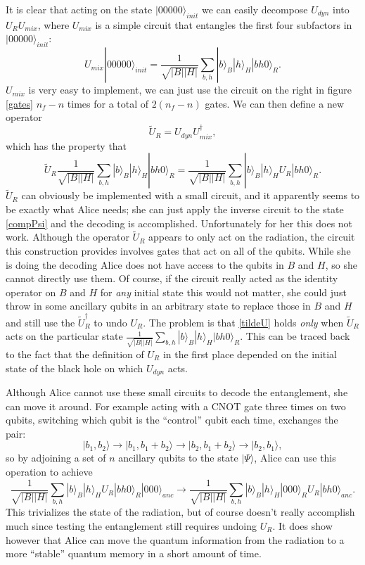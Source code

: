 \documentclass[12pt]{article}
\newcommand{\be}{\begin{equation}}
\newcommand{\ee}{\end{equation}}
\newcommand{\ran}{\rangle}
\begin{document}
It is clear that acting on the state $|00000\ran_{init}$ we can easily decompose $U_{dyn}$ into $U_R U_{mix}$, where $U_{mix}$ is a simple circuit that entangles the first four subfactors in $|00000\ran_{init}$:
\be\label{Umix}
U_{mix}|00000\ran_{init}=\frac{1}{\sqrt{|B||H|}}\sum_{b,h}|b\ran_B|h\ran_H|bh0\ran_R.
\ee
$U_{mix}$ is very easy to implement, we can just use the circuit on the right in figure \ref{gates} $n_f-n$ times for a total of $2(n_f-n)$ gates.  We can then define a new operator
\be
\tilde{U}_R=U_{dyn} U_{mix}^\dagger,
\ee
which has the property that
\be\label{tildeU}
\tilde{U}_R\frac{1}{\sqrt{|B||H|}}\sum_{b,h}|b\ran_B|h\ran_H|bh0\ran_R=\frac{1}{\sqrt{|B||H|}}\sum_{b,h}|b\ran_B|h\ran_HU_R|bh0\ran_R.
\ee
$\tilde{U}_R$ can obviously be implemented with a small circuit, and it apparently seems to be exactly what Alice needs; she can just apply the inverse circuit to the state \eqref{compPsi} and the decoding is accomplished.  Unfortunately for her this does not work.  Although the operator $\tilde{U}_R$ appears to only act on the radiation, the circuit this construction provides involves gates that act on all of the qubits.  While she is doing the decoding Alice does not have access to the qubits in $B$ and $H$, so she cannot directly use them.  Of course, if the circuit really acted as the identity operator on $B$ and $H$ for \textit{any} initial state this would not matter, she could just throw in some ancillary qubits in an arbitrary state to replace those in $B$ and $H$ and still use the $\tilde{U}_R^\dagger$ to undo $U_R$.  The problem is that \eqref{tildeU} holds \textit{only} when $\tilde{U}_R$ acts on the particular state $\frac{1}{\sqrt{|B||H|}}\sum_{b,h}|b\ran_B|h\ran_H|bh0\ran_R$.  This can be traced back to the fact that the definition of $U_R$ in the first place depended on the initial state of the black hole on which $U_{dyn}$ acts.  

Although Alice cannot use these small circuits to decode the entanglement, she can move it around.  For example acting with a CNOT gate three times on two qubits, switching which qubit is the ``control'' qubit each time, exchanges the pair:
\be
|b_1,b_2\ran\to|b_1,b_1+b_2\ran\to|b_2,b_1+b_2\ran\to|b_2,b_1\ran,
\ee
so by adjoining a set of $n$ ancillary qubits to the state $|\Psi\ran$, Alice can use this operation to achieve
\be
\frac{1}{\sqrt{|B||H|}}\sum_{b,h}|b\ran_B|h\ran_HU_R|bh0\ran_R|000\ran_{anc}\to \frac{1}{\sqrt{|B||H|}}\sum_{b,h}|b\ran_B|h\ran_H|000\ran_RU_R|bh0\ran_{anc}.
\ee
This trivializes the state of the radiation, but of course doesn't really accomplish much since testing the entanglement still requires undoing $U_R$.  It does show however that Alice can move the quantum information from the radiation to a more ``stable''  quantum memory in a short amount of time.  
\end{document}
